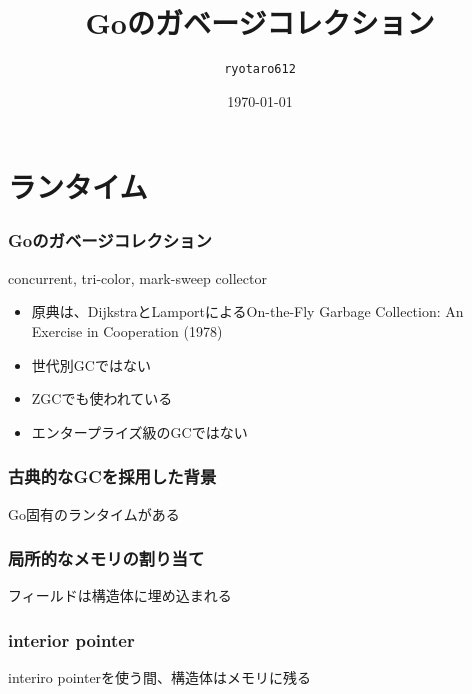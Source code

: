 \documentclass[unicode, 14pt, aspectratio=169]{beamer}
\date{\today}
\title{Goのガベージコレクション}
\author{\texttt{ryotaro612}}
\begin{document}
\begin{frame}
\titlepage
\end{frame}
\section{ランタイム}
\begin{frame}
  \frametitle{Goのガベージコレクション}
  {\large concurrent, tri-color, mark-sweep collector\supercite{go15gc}}
  \begin{itemize}
  \item 原典は、DijkstraとLamportによるOn-the-Fly Garbage Collection: An Exercise in Cooperation (1978)
  \item 世代別GCではない
  \item ZGCでも使われている
  \item エンタープライズ級のGCではない
  \end{itemize}
\end{frame}
\begin{frame}
  \frametitle{古典的なGCを採用した背景}
  {\large Go固有のランタイムがある}
\end{frame}
\begin{frame}
  \frametitle{局所的なメモリの割り当て}
  {\large フィールドは構造体に埋め込まれる}
\end{frame}
\begin{frame}
  \frametitle{interior pointer}
  {\large interiro pointerを使う間、構造体はメモリに残る}
\end{frame}
\end{document}
